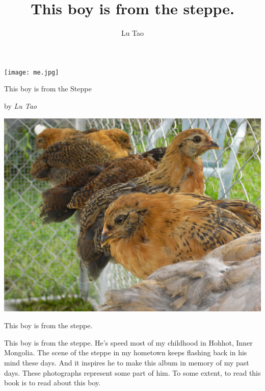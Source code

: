 \documentclass[10pt,final,openany]{book}
\title{This boy is from the steppe.}
\author{Lu Tao}
\begin{document}
\pagestyle{empty}

\begin{center}
  
\texttt{[image: me.jpg]}

\end{center}

\begin{center}
{\huge This boy is from the Steppe}

{\Large by \textit{ Lu Tao}}
\end{center}
\newpage



\newpage

\pagestyle{empty}

\includegraphics[width=8in]{R20090619-103748}

\begin{center}
{\LARGE This boy is from the steppe.}
\end{center}

{\large This boy is from the steppe.
He's speed most of my childhood in Hohhot, Inner Mongolia. 
The scene of the steppe in my hometown keeps flashing back in his mind these days.  
And it inspires he to make this album in memory of my past days.
These photographs represent some part of him.
To some extent, to read this book is to read about this boy.
}
\end{document}
